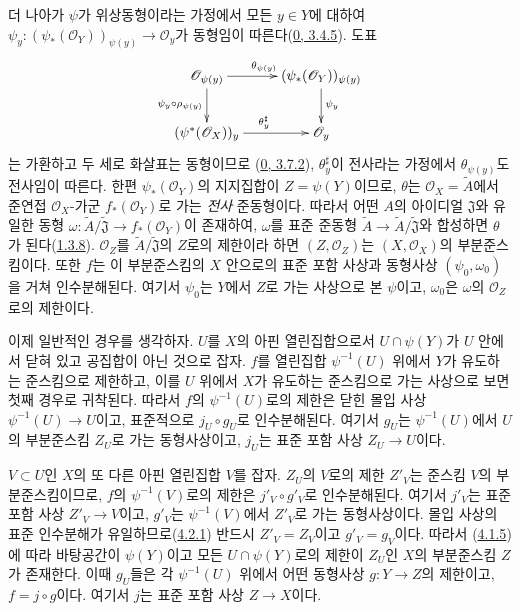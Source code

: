\begin{enumerate}
  더 나아가 $\psi$가 위상동형이라는 가정에서 모든 $y\in Y$에 대하여
  $\psi_y:(\psi_*(\mathscr{O}_Y))_{\psi(y)}\to\mathscr{O}_y$가
  동형임이 따른다(\hyperref[0.3.4.5-ko]{0, 3.4.5}). 도표
  \label{I.4.2.2.theta-diagram-ko}
  \[
    \xymatrix{
      \mathscr{O}_{\psi(y)}\ar[r]^{\theta_{\psi(y)}}
        \ar[d]_{\psi_y\circ\rho_{\psi(y)}} &
      (\psi_*(\mathscr{O}_Y))_{\psi(y)}\ar[d]^{\psi_y}\\
      (\psi^*(\mathscr{O}_X))_y\ar[r]^{\theta_y^\sharp} &
      \mathscr{O}_y
    }
  \]
  는 가환하고 두 세로 화살표는 동형이므로
  (\hyperref[0.3.7.2-ko]{0, 3.7.2}), $\theta_y^\sharp$이 전사라는
  가정에서 $\theta_{\psi(y)}$도 전사임이 따른다. 한편
  $\psi_*(\mathscr{O}_Y)$의 지지집합이 $Z=\psi(Y)$이므로,
  $\theta$는 $\mathscr{O}_X=\widetilde{A}$에서 준연접
  $\mathscr{O}_X$-가군 $f_*(\mathscr{O}_Y)$로 가는 \emph{전사}
  준동형이다. 따라서 어떤 $A$의 아이디얼 $\mathfrak{J}$와 유일한
  동형 $\omega:\widetilde{A}/\widetilde{\mathfrak{J}}
  \to f_*(\mathscr{O}_Y)$이 존재하여, $\omega$를 표준 준동형
  $\widetilde{A}\to\widetilde{A}/\widetilde{\mathfrak{J}}$와 합성하면
  $\theta$가 된다(\hyperref[I.1.3.8-ko]{1.3.8}).
  $\mathscr{O}_Z$를
  $\widetilde{A}/\widetilde{\mathfrak{J}}$의 $Z$로의 제한이라 하면
  $(Z,\mathscr{O}_Z)$는 $(X,\mathscr{O}_X)$의 부분준스킴이다.
  또한 $f$는 이 부분준스킴의 $X$ 안으로의 표준 포함 사상과 동형사상
  $(\psi_0,\omega_0)$을 거쳐 인수분해된다. 여기서 $\psi_0$는
  $Y$에서 $Z$로 가는 사상으로 본 $\psi$이고, $\omega_0$은
  $\omega$의 $\mathscr{O}_Z$로의 제한이다.

  이제 일반적인 경우를 생각하자. $U$를 $X$의 아핀 열린집합으로서
  $U\cap\psi(Y)$가 $U$ 안에서 닫혀 있고 공집합이 아닌 것으로 잡자.
  $f$를 열린집합 $\psi^{-1}(U)$ 위에서 $Y$가 유도하는 준스킴으로
  제한하고, 이를 $U$ 위에서 $X$가 유도하는 준스킴으로 가는 사상으로
  보면 첫째 경우로 귀착된다. 따라서 $f$의 $\psi^{-1}(U)$로의 제한은
  닫힌 몰입 사상 $\psi^{-1}(U)\to U$이고, 표준적으로
  $j_U\circ g_U$로 인수분해된다. 여기서 $g_U$는
  $\psi^{-1}(U)$에서 $U$의 부분준스킴 $Z_U$로 가는 동형사상이고,
  $j_U$는 표준 포함 사상 $Z_U\to U$이다.

  $V\subset U$인 $X$의 또 다른 아핀 열린집합 $V$를 잡자. $Z_U$의
  $V$로의 제한 $Z'_V$는 준스킴 $V$의 부분준스킴이므로, $f$의
  $\psi^{-1}(V)$로의 제한은 $j'_V\circ g'_V$로 인수분해된다. 여기서
  $j'_V$는 표준 포함 사상 $Z'_V\to V$이고, $g'_V$는
  $\psi^{-1}(V)$에서 $Z'_V$로 가는 동형사상이다. 몰입 사상의 표준
  인수분해가 유일하므로(\hyperref[I.4.2.1-ko]{4.2.1}) 반드시
  $Z'_V=Z_V$이고 $g'_V=g_V$이다. 따라서
  (\hyperref[I.4.1.5-ko]{4.1.5})에 따라 바탕공간이 $\psi(Y)$이고
  모든 $U\cap\psi(Y)$로의 제한이 $Z_U$인 $X$의 부분준스킴 $Z$가
  존재한다. 이때 $g_U$들은 각 $\psi^{-1}(U)$ 위에서 어떤 동형사상
  $g:Y\to Z$의 제한이고, $f=j\circ g$이다. 여기서 $j$는 표준 포함
  사상 $Z\to X$이다.
\end{enumerate}

